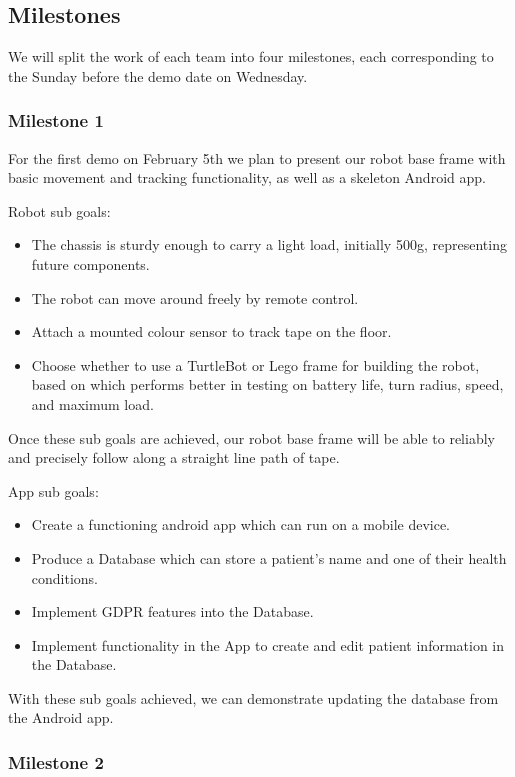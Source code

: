 \documentclass{article}
\begin{document}
\subsection{Milestones} 
We will split the work of each team into four milestones, each corresponding to the Sunday before the demo date on Wednesday. 

\subsubsection{Milestone 1}
For the first demo on February 5th we plan to present our robot base frame with basic movement and tracking functionality, as well as a skeleton Android app.

Robot sub goals:
\begin{itemize}
\item The chassis is sturdy enough to carry a light load, initially 500g, representing future components. %
\item The robot can move around freely by remote control.
\item Attach a mounted colour sensor to track tape on the floor.  %
\item Choose whether to use a TurtleBot or Lego frame for building the robot, based on which performs better in testing on battery life, turn radius, speed, and maximum load. 
\end{itemize}


Once these sub goals are achieved, our robot base frame will be able to reliably and precisely follow along a straight line path of tape. 

App sub goals:
\begin{itemize}
\item Create a functioning android app which can run on a mobile device.
\item Produce a Database which can store a patient's name and one of their health conditions.
\item Implement GDPR features into the Database.
\item Implement functionality in the App to create and edit patient information in the Database.
\end{itemize}

With these sub goals achieved, we can demonstrate updating the database from the Android app.

\subsubsection{Milestone 2}
\end{document}
